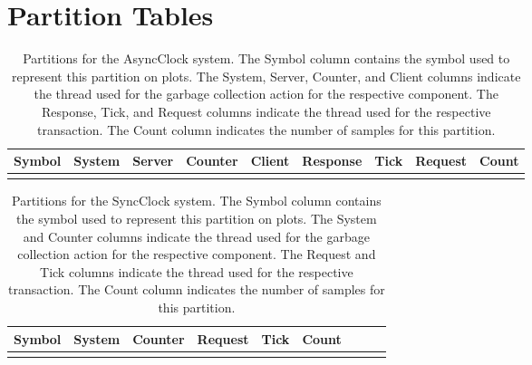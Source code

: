 \documentclass[letterpaper]{book}
\begin{document}













{}

\appendix

\chapter{Partition Tables}

\begin{longtable}{ccccccccr}
Symbol & System & Server & Counter & Client & Response & Tick & Request & Count \\
\hline
\endhead

\caption{Partitions for the AsyncClock system.  The Symbol column contains the symbol used to represent this partition on plots.  The System, Server, Counter, and Client columns indicate the thread used for the garbage collection action for the respective component.  The Response, Tick, and Request columns indicate the thread used for the respective transaction.  The Count column indicates the number of samples for this partition.}
\label{async_partitions}
\end{longtable}

\begin{longtable}{ccccccccr}
Symbol & System & Counter & Request & Tick & Count \\
\hline
\endhead

\caption{Partitions for the SyncClock system.  The Symbol column contains the symbol used to represent this partition on plots.  The System and Counter columns indicate the thread used for the garbage collection action for the respective component.  The Request and Tick columns indicate the thread used for the respective transaction.  The Count column indicates the number of samples for this partition.}
\label{sync_partitions}
\end{longtable}
\end{document}

